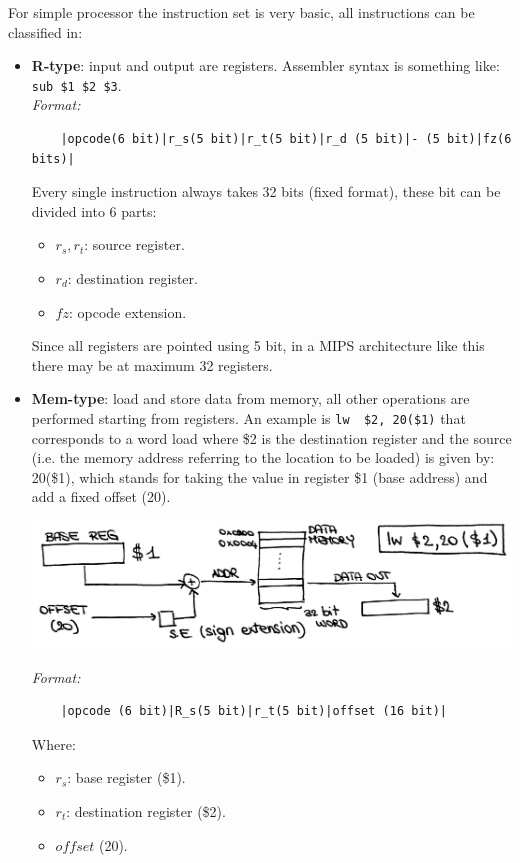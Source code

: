 For simple processor the instruction set is very basic, all instructions can be classified in:
\begin{itemize}

  \item \textbf{R-type}: input and output are registers. Assembler syntax is something like: \verb|sub $1 $2 $3|.\\
    \textit{Format:}

    \begin{verbatim}
    |opcode(6 bit)|r_s(5 bit)|r_t(5 bit)|r_d (5 bit)|- (5 bit)|fz(6 bits)|
    \end{verbatim}
    Every single instruction always takes 32 bits (fixed format), these bit can be divided into 6 parts:

    \begin{itemize}
    \item $r_s, r_t$: source register.
    \item $r_d$: destination register.
    \item $fz$: opcode extension.
    \end{itemize}

    Since all registers are pointed using 5 bit, in a MIPS architecture like this there may be at maximum 32 registers.

  \item \textbf{Mem-type}: load and store data from memory, all other operations are performed starting from registers.
    An example is \verb|lw  $2, 20($1)| that corresponds to a word load where \$2 is the destination register and the source (i.e. the memory address referring to the location to be loaded) is given by: 20(\$1), which stands for taking the value in register \$1 (base address) and add a fixed offset (20).
    \begin{center}
      \includegraphics[width=0.8\linewidth]{img/img3/1}
    \end{center}

    \textit{Format:}
    \begin{verbatim}
    |opcode (6 bit)|R_s(5 bit)|r_t(5 bit)|offset (16 bit)|
    \end{verbatim}
    Where:
    \begin{itemize}
      \item $r_s$: base register (\$1).
      \item $r_t$: destination register (\$2).
      \item $offset$ (20).
    \end{itemize}


\end{itemize}
